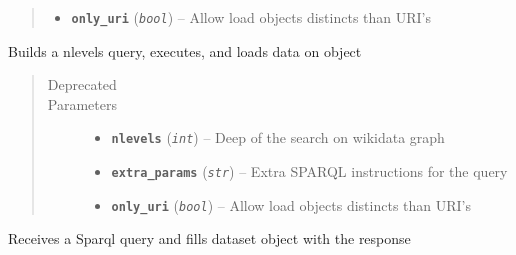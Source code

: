 \documentclass[letterpaper,10pt,english]{sphinxmanual}
\begin{document}
\begin{fulllineitems}
\begin{fulllineitems}
\begin{quote}
\begin{description}
\begin{itemize}
\item {} 
\textbf{\texttt{only\_uri}} (\emph{\texttt{bool}}) -- Allow load objects distincts than URI's

\end{itemize}

\end{description}\end{quote}

\end{fulllineitems}


\begin{fulllineitems}
\label{index:dataset.Dataset.load_dataset_from_nlevels}
Builds a nlevels query, executes, and loads data on object
\begin{quote}\begin{description}
\item[{Deprecated}] \leavevmode
\item[{Parameters}] \leavevmode\begin{itemize}
\item {} 
\textbf{\texttt{nlevels}} (\emph{\texttt{int}}) -- Deep of the search on wikidata graph

\item {} 
\textbf{\texttt{extra\_params}} (\emph{\texttt{str}}) -- Extra SPARQL instructions for the query

\item {} 
\textbf{\texttt{only\_uri}} (\emph{\texttt{bool}}) -- Allow load objects distincts than URI's

\end{itemize}

\end{description}\end{quote}

\end{fulllineitems}


\begin{fulllineitems}
\label{index:dataset.Dataset.load_dataset_from_query}
Receives a Sparql query and fills dataset object with the response


\end{fulllineitems}
\end{fulllineitems}
\end{document}
